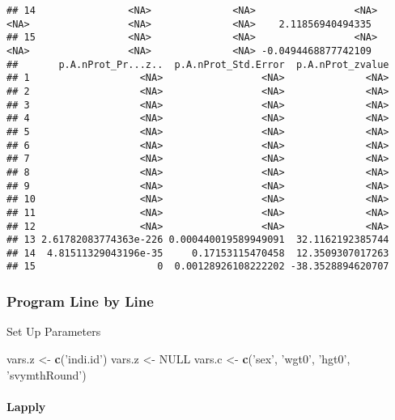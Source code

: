 \documentclass[
]{book}
\newenvironment{Shaded}{\begin{snugshade}}{\end{snugshade}}
\newcommand{\KeywordTok}[1]{\textcolor[rgb]{0.13,0.29,0.53}{\textbf{#1}}}
\newcommand{\NormalTok}[1]{#1}
\newcommand{\OtherTok}[1]{\textcolor[rgb]{0.56,0.35,0.01}{#1}}
\newcommand{\StringTok}[1]{\textcolor[rgb]{0.31,0.60,0.02}{#1}}
\begin{document}
\begin{verbatim}
## 14                <NA>              <NA>                 <NA>                  <NA>                 <NA>              <NA>    2.11856940494335
## 15                <NA>              <NA>                 <NA>                  <NA>                 <NA>              <NA> -0.0494468877742109
##       p.A.nProt_Pr...z..  p.A.nProt_Std.Error  p.A.nProt_zvalue
## 1                   <NA>                 <NA>              <NA>
## 2                   <NA>                 <NA>              <NA>
## 3                   <NA>                 <NA>              <NA>
## 4                   <NA>                 <NA>              <NA>
## 5                   <NA>                 <NA>              <NA>
## 6                   <NA>                 <NA>              <NA>
## 7                   <NA>                 <NA>              <NA>
## 8                   <NA>                 <NA>              <NA>
## 9                   <NA>                 <NA>              <NA>
## 10                  <NA>                 <NA>              <NA>
## 11                  <NA>                 <NA>              <NA>
## 12                  <NA>                 <NA>              <NA>
## 13 2.61782083774363e-226 0.000440019589949091  32.1162192385744
## 14  4.81511329043196e-35     0.17153115470458  12.3509307017263
## 15                     0  0.00128926108222202 -38.3528894620707
\end{verbatim}

\hypertarget{program-line-by-line}{%
\subsubsection{Program Line by Line}\label{program-line-by-line}}

Set Up Parameters

\begin{Shaded}
\begin{Highlighting}[]
\NormalTok{vars.z <-}\StringTok{ }\KeywordTok{c}\NormalTok{(}\StringTok{'indi.id'}\NormalTok{)}
\NormalTok{vars.z <-}\StringTok{ }\OtherTok{NULL}
\NormalTok{vars.c <-}\StringTok{ }\KeywordTok{c}\NormalTok{(}\StringTok{'sex'}\NormalTok{, }\StringTok{'wgt0'}\NormalTok{, }\StringTok{'hgt0'}\NormalTok{, }\StringTok{'svymthRound'}\NormalTok{)}
\end{Highlighting}
\end{Shaded}

\hypertarget{lapply}{%
\paragraph{Lapply}\label{lapply}}
\end{document}
